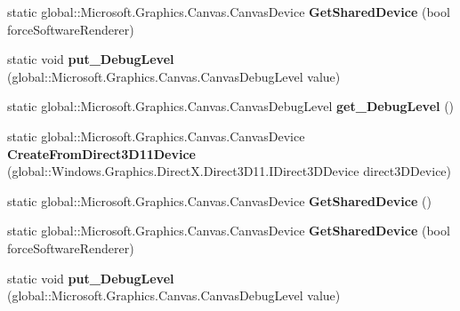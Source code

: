 \begin{DoxyCompactItemize}
static global\+::\+Microsoft.\+Graphics.\+Canvas.\+Canvas\+Device {\bfseries Get\+Shared\+Device} (bool force\+Software\+Renderer)
\item 
\mbox{\label{class_microsoft_1_1_graphics_1_1_canvas_1_1_canvas_device_ab9c64c019ceb46a0ce7750c7672266bf}} 
static void {\bfseries put\+\_\+\+Debug\+Level} (global\+::\+Microsoft.\+Graphics.\+Canvas.\+Canvas\+Debug\+Level value)
\item 
\mbox{\label{class_microsoft_1_1_graphics_1_1_canvas_1_1_canvas_device_ab81e13bacbccaa108210dc500f9f64fd}} 
static global\+::\+Microsoft.\+Graphics.\+Canvas.\+Canvas\+Debug\+Level {\bfseries get\+\_\+\+Debug\+Level} ()
\item 
\mbox{\label{class_microsoft_1_1_graphics_1_1_canvas_1_1_canvas_device_ac34f7ec06b15bc5f366d17073c7a044b}} 
static global\+::\+Microsoft.\+Graphics.\+Canvas.\+Canvas\+Device {\bfseries Create\+From\+Direct3\+D11\+Device} (global\+::\+Windows.\+Graphics.\+Direct\+X.\+Direct3\+D11.\+I\+Direct3\+D\+Device direct3\+D\+Device)
\item 
\mbox{\label{class_microsoft_1_1_graphics_1_1_canvas_1_1_canvas_device_a773190aa560cbf1b1dc04ae5b544481f}} 
static global\+::\+Microsoft.\+Graphics.\+Canvas.\+Canvas\+Device {\bfseries Get\+Shared\+Device} ()
\item 
\mbox{\label{class_microsoft_1_1_graphics_1_1_canvas_1_1_canvas_device_acb468348f5f4cc3993e0cda3133a3756}} 
static global\+::\+Microsoft.\+Graphics.\+Canvas.\+Canvas\+Device {\bfseries Get\+Shared\+Device} (bool force\+Software\+Renderer)
\item 
\mbox{\label{class_microsoft_1_1_graphics_1_1_canvas_1_1_canvas_device_ab9c64c019ceb46a0ce7750c7672266bf}} 
static void {\bfseries put\+\_\+\+Debug\+Level} (global\+::\+Microsoft.\+Graphics.\+Canvas.\+Canvas\+Debug\+Level value)
\item 
\mbox{\label{class_microsoft_1_1_graphics_1_1_canvas_1_1_canvas_device_ab81e13bacbccaa108210dc500f9f64fd}} 

\end{DoxyCompactItemize}
